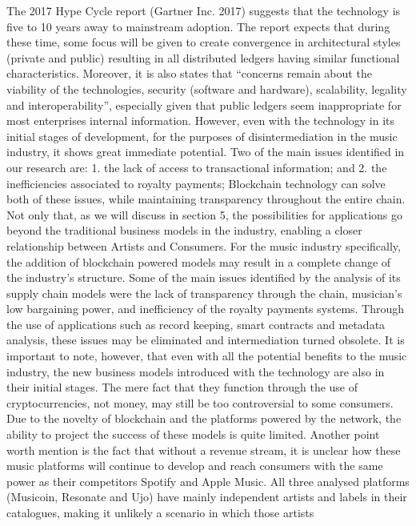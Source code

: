 The 2017 Hype Cycle report (Gartner Inc. 2017) suggests that the technology is five to 10 years away
to mainstream adoption. The report expects that during these time, some focus will be given to create
convergence in architectural styles (private and public) resulting in all distributed ledgers having
similar functional characteristics. Moreover, it is also states that “concerns remain about the viability
of the technologies, security (software and hardware), scalability, legality and interoperability”,
especially given that public ledgers seem inappropriate for most enterprises internal information.
However, even with the technology in its initial stages of development, for the purposes of
disintermediation in the music industry, it shows great immediate potential. Two of the main issues
identified in our research are:
1. the lack of access to transactional information; and
2. the inefficiencies associated to royalty payments;
Blockchain technology can solve both of these issues, while maintaining transparency
throughout the entire chain. Not only that, as we will discuss in section 5, the possibilities for
applications go beyond the traditional business models in the industry, enabling a closer relationship
between Artists and Consumers. 
For the music industry specifically, the addition of blockchain powered models may result in a
complete change of the industry’s structure. Some of the main issues identified by the analysis of its
supply chain models were the lack of transparency through the chain, musician’s low bargaining
power, and inefficiency of the royalty payments systems. Through the use of applications such as
record keeping, smart contracts and metadata analysis, these issues may be eliminated and
intermediation turned obsolete.
It is important to note, however, that even with all the potential benefits to the music industry, the
new business models introduced with the technology are also in their initial stages. The mere fact that
they function through the use of cryptocurrencies, not money, may still be too controversial to some consumers. Due to the novelty of blockchain and the platforms powered by the network, the ability
to project the success of these models is quite limited.
Another point worth mention is the fact that without a revenue stream, it is unclear how these music
platforms will continue to develop and reach consumers with the same power as their competitors
Spotify and Apple Music. All three analysed platforms (Musicoin, Resonate and Ujo) have mainly
independent artists and labels in their catalogues, making it unlikely a scenario in which those artists
